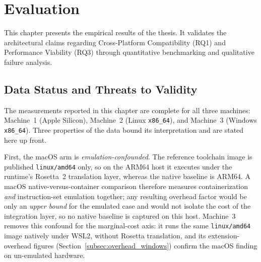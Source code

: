 % 
% 
% 

\chapter{Evaluation}
\label{ch:evaluation}

This chapter presents the empirical results of the thesis. It validates the architectural claims regarding Cross-Platform Compatibility (RQ1) and Performance Viability (RQ3) through quantitative benchmarking and qualitative failure analysis.

\section{Data Status and Threats to Validity}
\label{sec:data_status}
The measurements reported in this chapter are complete for all three machines: Machine~1 (Apple Silicon), Machine~2 (Linux \texttt{x86\_64}), and Machine~3 (Windows \texttt{x86\_64}). Three properties of the data bound its interpretation and are stated here up front.

First, the macOS arm is \emph{emulation-confounded}. The reference toolchain image is published \texttt{linux/amd64} only, so on the ARM64 host it executes under the runtime's Rosetta~2 translation layer, whereas the native baseline is ARM64. A macOS native-versus-container comparison therefore measures containerization \emph{and} instruction-set emulation together; any resulting overhead factor would be only an \emph{upper bound} for the emulated case and would not isolate the cost of the integration layer, so no native baseline is captured on this host. Machine~3 removes this confound for the marginal-cost axis: it runs the same \texttt{linux/amd64} image natively under WSL2, without Rosetta translation, and its extension-overhead figures (Section~\ref{subsec:overhead_windows}) confirm the macOS finding on un-emulated hardware.

